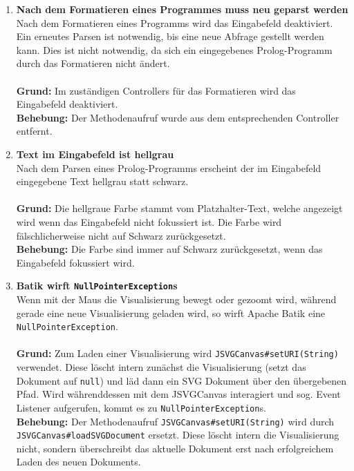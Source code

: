 \documentclass[parskip=full,11pt,twoside]{scrartcl}
\begin{document}
\begin{enumerate}[label=\#\arabic*]
  \item \textbf{Nach dem Formatieren eines Programmes muss neu geparst werden}\\
        Nach dem Formatieren eines Programms wird das Eingabefeld deaktiviert. Ein erneutes Parsen ist notwendig, bis eine neue Abfrage gestellt werden kann. Dies ist nicht notwendig, da sich ein eingegebenes Prolog-Programm durch das Formatieren nicht ändert.\\\\
        \textbf{Grund:} Im zuständigen Controllers für das Formatieren wird das Eingabefeld deaktiviert.\\
        \textbf{Behebung:} Der Methodenaufruf wurde aus dem entsprechenden Controller entfernt.

  \item \textbf{Text im Eingabefeld ist hellgrau}\\
        Nach dem Parsen eines Prolog-Programms erscheint der im Eingabefeld eingegebene Text hellgrau statt schwarz.\\\\
        \textbf{Grund:} Die hellgraue Farbe stammt vom Platzhalter-Text, welche angezeigt wird wenn das Eingabefeld nicht fokussiert ist. Die Farbe wird fälschlicherweise nicht auf Schwarz zurückgesetzt.\\
        \textbf{Behebung:} Die Farbe sind immer auf Schwarz zurückgesetzt, wenn das Eingabefeld fokussiert wird.

  \item \textbf{Batik wirft \texttt{NullPointerException}s}\\
        Wenn mit der Maus die Visualisierung bewegt oder gezoomt wird, während gerade eine neue Visualisierung geladen wird, so wirft Apache Batik eine \texttt{NullPointerException}.\\\\
        \textbf{Grund:} Zum Laden einer Visualisierung wird \texttt{JSVGCanvas\#setURI(String)} verwendet. Diese löscht intern zunächst die Visualisierung (setzt das Dokument auf \texttt{null}) und läd dann ein SVG Dokument über den übergebenen Pfad. Wird währenddessen mit dem JSVGCanvas interagiert und sog. Event Listener aufgerufen, kommt es zu \texttt{NullPointerException}s.\\
        \textbf{Behebung:} Der Methodenaufruf \texttt{JSVGCanvas\#setURI(String)} wird durch \texttt{JSVGCanvas\#loadSVGDocument} ersetzt. Diese löscht intern die Visualisierung nicht, sondern überschreibt das aktuelle Dokument erst nach erfolgreichem Laden des neuen Dokuments.


\end{enumerate}
\end{document}

